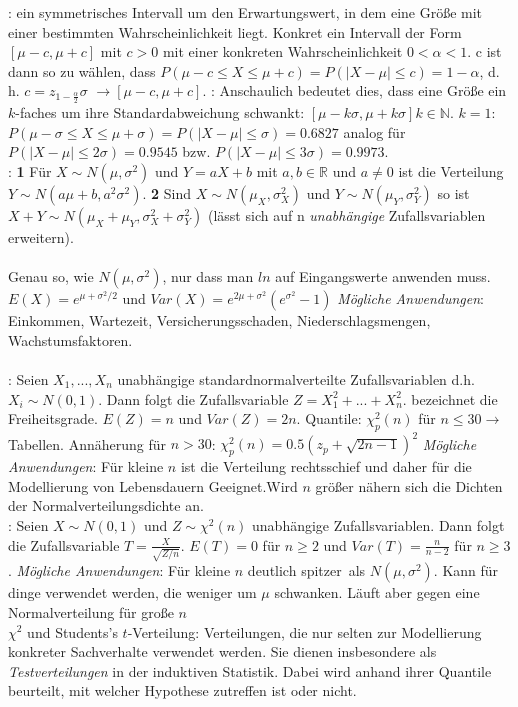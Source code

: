 : ein symmetrisches Intervall um den Erwartungswert, in dem eine Größe mit einer bestimmten Wahrscheinlichkeit liegt. Konkret ein Intervall der Form $[\mu - c, \mu + c]$ mit $c > 0$ mit einer konkreten Wahrscheinlichkeit $0 < \alpha < 1$. c ist dann so zu wählen, dass $P(\mu - c \le X \le \mu + c) = P(|X - \mu| \le c) = 1 - \alpha$, d. h. $c = z_{1 - \frac{\alpha}{2}} \sigma$ $\rightarrow [\mu - c, \mu + c]$. : Anschaulich bedeutet dies, dass eine Größe ein $k$-faches um ihre Standardabweichung schwankt: $[\mu - k\sigma, \mu + k\sigma] k\in \mathds{N}$. $k = 1$: $P(\mu - \sigma \le X \le \mu + \sigma) = P(|X - \mu| \le \sigma) = 0.6827$ analog für $P(|X - \mu| \le 2\sigma) = 0.9545$ bzw. $P(|X - \mu| \le 3\sigma) = 0.9973$.\\
: \textbf{1} Für $X \sim N(\mu, \sigma^2)$ und $Y = a X + b$ mit $a, b \in \mathds{R}$ und $a \neq 0$ ist die Verteilung $Y \sim N(a\mu + b,a^2 \sigma^2)$. \textbf{2} Sind $X \sim N(\mu_X, \sigma_X^2)$ und $Y \sim N(\mu_Y, \sigma_Y^2)$ so ist $X + Y \sim N(\mu_X + \mu_Y, \sigma_X^2 + \sigma_Y^2)$ (lässt sich auf n \emph{unabhängige} Zufallsvariablen erweitern).\\\\
 Genau so, wie $N(\mu, \sigma^2)$, nur dass man $ln$ auf Eingangswerte anwenden muss. $E(X) = e^{\mu + \sigma^2/2}$ und $Var(X) = e^{2\mu + \sigma^2}(e^{\sigma^2} - 1)$ \emph{Mögliche Anwendungen}: Einkommen, Wartezeit, Versicherungsschaden, Niederschlagsmengen, Wachstumsfaktoren.\\\\

: Seien $X_1, ..., X_n$ unabhängige standardnormalverteilte Zufallsvariablen d.h. $X_i \sim N(0, 1)$. Dann folgt die Zufallsvariable $Z = X_1^2 + ... + X_n^2$.  bezeichnet die Freiheitsgrade. $E(Z) = n$ und $Var(Z) = 2n$. Quantile: $\chi_p^2(n)$ für $n \le 30 \rightarrow$ Tabellen. Annäherung für $n > 30$: $\chi_p^2(n)=0.5(z_p + \sqrt{2n - 1})^2$  \emph{Mögliche Anwendungen}: Für kleine $n$ ist die Verteilung rechtsschief und daher für die Modellierung von Lebensdauern Geeignet.Wird $n$ größer nähern  sich die Dichten der Normalverteilungsdichte an.\\
: Seien $X \sim N(0, 1)$ und $Z \sim \chi^2(n)$ unabhängige Zufallsvariablen. Dann folgt die Zufallsvariable $T = \frac{X}{\sqrt{Z/n}}$. $E(T) = 0$ für $n \ge 2$ und $Var(T) = \frac{n}{n-2}$ für $n \ge 3$. \emph{Mögliche Anwendungen}: Für kleine $n$ deutlich \glqq spitzer\grqq\, als $N(\mu, \sigma^2)$. Kann für dinge verwendet werden, die weniger um $\mu$ schwanken. Läuft aber gegen eine Normalverteilung für große $n$\\
$\chi^2$ und Students's $t$-Verteilung: Verteilungen, die nur selten zur Modellierung konkreter Sachverhalte verwendet werden. Sie dienen insbesondere als \emph{Testverteilungen} in der induktiven Statistik. Dabei wird anhand ihrer Quantile beurteilt, mit welcher Hypothese zutreffen ist oder nicht.

